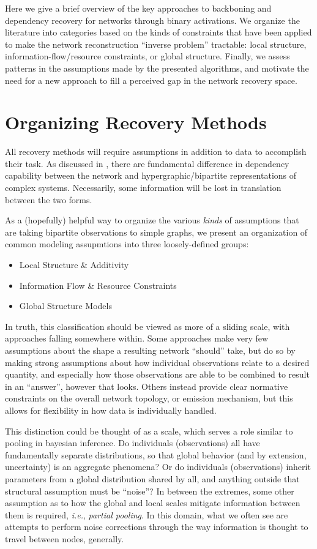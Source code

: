\documentclass[%
	12pt,
		oneside,
		letterpaper
]{book}
\providecommand{\tightlist}{%
  \setlength{\itemsep}{0pt}\setlength{\parskip}{0pt}}
\begin{document}
Here we give a brief overview of the key approaches to backboning and
dependency recovery for networks through binary activations. We organize
the literature into categories based on the kinds of constraints that
have been applied to make the network reconstruction ``inverse problem''
tractable: local structure, information-flow/resource constraints, or
global structure. Finally, we assess patterns in the assumptions made by
the presented algorithms, and motivate the need for a new approach to
fill a perceived gap in the network recovery space.

\section{Organizing Recovery Methods}\label{organizing-recovery-methods}

All recovery methods will require assumptions in addition to data to
accomplish their task. As discussed in \textcite{WhyHowWhen_Torres2021},
there are fundamental difference in dependency capability between the
network and hypergraphic/bipartite representations of complex systems.
Necessarily, some information will be lost in translation between the
two forms.

As a (hopefully) helpful way to organize the various \emph{kinds} of
assumptions that are taking bipartite observations to simple graphs, we
present an organization of common modeling assupmtions into three
loosely-defined groups:

\begin{itemize}
\tightlist
\item
  Local Structure \& Additivity
\item
  Information Flow \& Resource Constraints
\item
  Global Structure Models
\end{itemize}

In truth, this classification should be viewed as more of a sliding
scale, with approaches falling somewhere within. Some approaches make
very few assumptions about the shape a resulting network ``should''
take, but do so by making strong assumptions about how individual
observations relate to a desired quantity, and especially how those
observations are able to be combined to result in an ``answer'', however
that looks. Others instead provide clear normative constraints on the
overall network topology, or emission mechanism, but this allows for
flexibility in how data is individually handled.

This distinction could be thought of as a scale, which serves a role
similar to pooling in bayesian inference. Do individuals (observations)
all have fundamentally separate distributions, so that global behavior
(and by extension, uncertainty) is an aggregate phenomena? Or do
individuals (observations) inherit parameters from a global distribution
shared by all, and anything outside that structural assumption must be
``noise''? In between the extremes, some other assumption as to how the
global and local scales mitigate information between them is required,
\emph{i.e.}, \emph{partial pooling}. In this domain, what we often see
are attempts to perform noise corrections through the way information is
thought to travel between nodes, generally.
\end{document}
